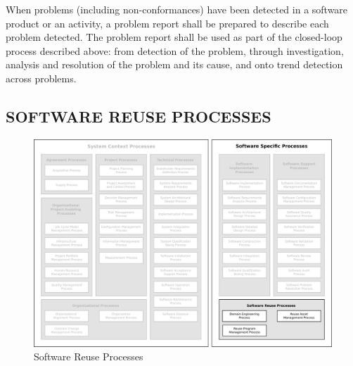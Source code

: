\begin{adjustwidth}{2em}{0pt}
\begin{compactenum}
					\begin{compactenum}

						\item When problems (including non-conformances) have been detected in a software product or an activity, a problem report shall be prepared to describe each problem detected. The problem report shall be used as part of the closed-loop process described above: from detection of the problem, through investigation, analysis and resolution of the problem and its cause, and onto trend detection across problems.

					\end{compactenum}

				\end{compactenum}

			\end{adjustwidth}


	\newpage 
	\subsection{SOFTWARE REUSE PROCESSES\label{subsec:software_reuse_processes}}

		\begin{figure}[h]
			\centering
			\includegraphics[width=15cm,keepaspectratio]{figures/life-cycle-process-groups-software-reuse-processes.pdf}
			\caption{Software Reuse Processes}
			\label{fig:software_reuse_processes}
		\end{figure}

